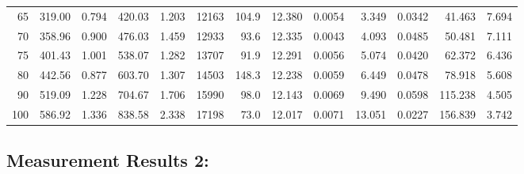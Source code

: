 \documentclass[10pt]{article}
\begin{document}
{\begin{tabular}{|r|rr|rr|rr|rr|rr|r|r|}
       65 &       319.00 &        0.794 &       420.03 &        1.203 &        12163 &        104.9 &       12.380 &       0.0054 &        3.349 &       0.0342 &       41.463 &        7.694 \\
       70 &       358.96 &        0.900 &       476.03 &        1.459 &        12933 &         93.6 &       12.335 &       0.0043 &        4.093 &       0.0485 &       50.481 &        7.111 \\
       75 &       401.43 &        1.001 &       538.07 &        1.282 &        13707 &         91.9 &       12.291 &       0.0056 &        5.074 &       0.0420 &       62.372 &        6.436 \\
       80 &       442.56 &        0.877 &       603.70 &        1.307 &        14503 &        148.3 &       12.238 &       0.0059 &        6.449 &       0.0478 &       78.918 &        5.608 \\
       90 &       519.09 &        1.228 &       704.67 &        1.706 &        15990 &         98.0 &       12.143 &       0.0069 &        9.490 &       0.0598 &      115.238 &        4.505 \\
      100 &       586.92 &        1.336 &       838.58 &        2.338 &        17198 &         73.0 &       12.017 &       0.0071 &       13.051 &       0.0227 &      156.839 &        3.742 \\
\hline
\end{tabular}
}



\subsection*{\large \bf Measurement Results 2:}
\end{document}
